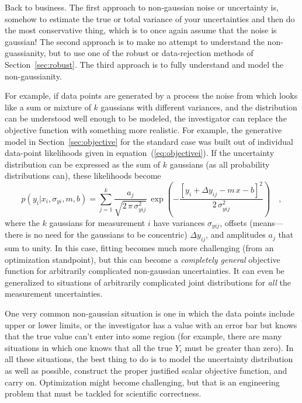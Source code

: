 \documentclass[12pt,twoside]{article}
\newcommand{\sectionname}{Section}
\newcommand{\equationname}{equation}
\newcounter{problem}
\begin{document}
Back to business.  The first approach to non-gaussian noise or
uncertainty is, somehow to estimate the true or total variance of your
uncertainties and then do the most conservative thing, which is to
once again assume that the noise is gaussian!  The second approach is
to make no attempt to understand the non-guassianity, but to use one
of the robust or data-rejection methods of
\sectionname~\ref{sec:robust}.  The third approach is to fully
understand and model the non-gaussianity.

For example, if data points are generated by a process the noise from
which looks like a sum or mixture of $k$ gaussians with different
variances, and the distribution can be understood well enough to be
modeled, the investigator can replace the objective function with
something more realistic.  For example, the generative model in
\sectionname~\ref{sec:objective} for the standard case was built out
of individual data-point likelihoods given in
\equationname~(\ref{eq:objectivei}).  If the uncertainty distribution
can be expressed as the sum of $k$ gaussians (as all probability
distributions can), these likelihoods become
\begin{equation}
p(y_i|x_i,\sigma_{yi},m,b) = \sum_{j=1}^k
 \frac{a_j}{\sqrt{2\,\pi\,\sigma_{yij}^2}}
 \,\exp\left(-\frac{[y_i+\Delta y_{ij}-m\,x-b]^2}{2\,\sigma_{yij}^2}\right)
 \quad ,
\end{equation}
where the $k$ gaussians for measurement $i$ have variances
$\sigma_{yij}$, offsets (means---there is no need for the gaussians to
be concentric) $\Delta y_{ij}$, and amplitudes $a_j$ that sum to
unity.  In this case, fitting becomes much more challenging (from an
optimization standpoint), but this can become a \emph{completely
  general} objective function for arbitrarily complicated non-gaussian
uncertainties.  It can even be generalized to situations of
arbitrarily complicated joint distributions for \emph{all} the
measurement uncertainties.

One very common non-gaussian situation is one in which the data points
include upper or lower limits, or the investigator has a value with an
error bar but knows that the true value can't enter into some region
(for example, there are many situations in which one knows that all
the true $Y_i$ must be greater than zero).  In all these situations,
the best thing to do is to model the uncertainty distribution as well
as possible, construct the proper justified scalar objective function,
and carry on.  Optimization might become challenging, but that is an
engineering problem that must be tackled for scientific correctness.
\end{document}
